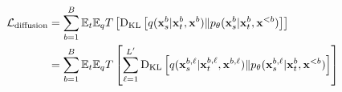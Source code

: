 \documentclass{article} %
\newcommand{\TODO}[1]{\textcolor{red}{[TODO: #1]}}
\begin{document}
\begin{align}
     \mathcal{L}_{\text{diffusion}} & = \sum_{b = 1}^{B} \mathbb{E}_{t} \mathbb{E}_{q} T \left[\kl \left[q(\x^b_s | \x^b_t, \x^b) \| \p(\x^b_s | \x^{b}_t, \x^{<b})\right] \right] \nonumber \\
    & = \sum_{b = 1}^{B} \mathbb{E}_{t} \mathbb{E}_{q} T \left[\sum_{\ell = 1}^{L'} \kl \left[q(\xlb_s | \xlb_t, \x^{b,\ell}) \| \p(\xlb_s | \x^{b}_t, \x^{<b})\right] \right] \nonumber \\

\end{align}
\end{document}
